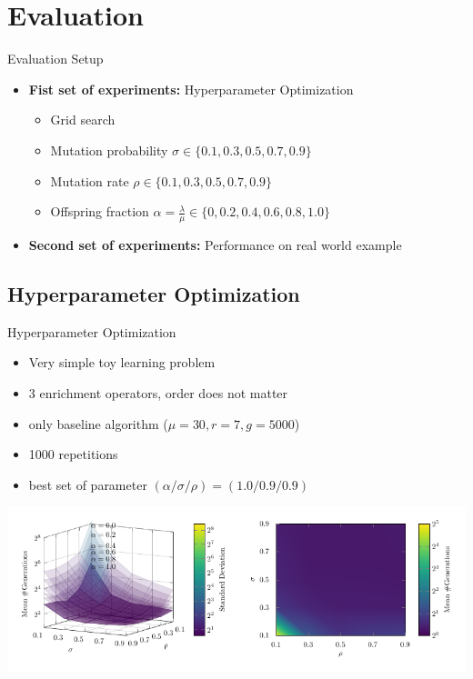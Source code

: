 \documentclass[aspectratio=1610,table]{beamer}
\begin{document}
\section{Evaluation}
\begin{frame}{Evaluation Setup}
\begin{itemize}
  \item \textbf{Fist set of experiments:} Hyperparameter Optimization
  \begin{itemize}
  \item Grid search
  \item Mutation probability $\sigma \in \{0.1,0.3,0.5,0.7,0.9\}$
  \item Mutation rate $\rho \in \{0.1,0.3,0.5,0.7,0.9\}$
  \item Offspring fraction $\alpha = \frac{\lambda}{\mu} \in \{0, 0.2, 0.4, 0.6, 0.8, 1.0 \} $
  \end{itemize}
  \item \textbf{Second set of experiments:} Performance on real world example
\end{itemize}
\end{frame}

\subsection{Hyperparameter Optimization}
\begin{frame}{Hyperparameter Optimization}
\begin{itemize}
  \item Very simple toy learning problem
  \item 3 enrichment operators, order does not matter
  \item only baseline algorithm ($\mu = 30, r=7, g=5000$)
  \item 1000 repetitions
  \item best set of parameter $(\alpha/\sigma/\rho)=(1.0/0.9/0.9)$
\end{itemize}
\begin{center}
  \includegraphics[page=1]{gfx/graphs}
\end{center}
\end{frame}
\end{document}
